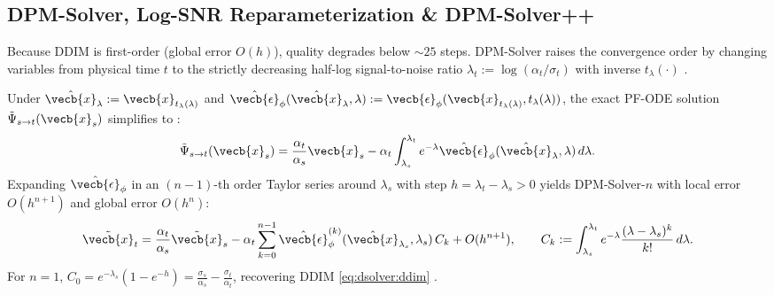 \documentclass[../../../../master.tex]{subfiles}
\begin{document}
\subsection{DPM-Solver, Log-SNR Reparameterization \& DPM-Solver++}

Because DDIM is first-order (global error $O(h)$), quality degrades below $\sim 25$ steps. DPM-Solver raises the convergence order by changing variables from physical time $t$ to the strictly decreasing half-log signal-to-noise ratio $\lambda_t := \log(\alpha_t/\sigma_t)$ with inverse $t_\lambda(\cdot)$ .

\begin{coremath}
Under $\hat{\vecb{x}}_\lambda := \vecb{x}_{t_\lambda(\lambda)}$ and $\hat{\vecb{\epsilon}}_\phi(\hat{\vecb{x}}_\lambda, \lambda) := \vecb{\epsilon}_\phi(\vecb{x}_{t_\lambda(\lambda)}, t_\lambda(\lambda))$, the exact PF-ODE solution $\tilde{\Psi}_{s\to t}(\vecb{x}_s)$ simplifies to :
\begin{equation}
  \label{eq:dsolver:dpm_exact}
  \tilde{\Psi}_{s\to t}(\vecb{x}_s) = \frac{\alpha_t}{\alpha_s}\vecb{x}_s - \alpha_t \int_{\lambda_s}^{\lambda_t} e^{-\lambda} \hat{\vecb{\epsilon}}_\phi(\hat{\vecb{x}}_\lambda, \lambda)\,d\lambda.
\end{equation}
Expanding $\hat{\vecb{\epsilon}}_\phi$ in an $(n-1)$-th order Taylor series around $\lambda_s$ with step $h = \lambda_t - \lambda_s > 0$ yields DPM-Solver-$n$ with local error $O(h^{n+1})$ and global error $O(h^n)$:
\begin{equation}
  \label{eq:dsolver:dpm_taylor}
  \tilde{\vecb{x}}_t = \frac{\alpha_t}{\alpha_s}\tilde{\vecb{x}}_s - \alpha_t \sum_{k=0}^{n-1} \hat{\vecb{\epsilon}}_\phi^{(k)}(\hat{\vecb{x}}_{\lambda_s}, \lambda_s)\, C_k + O(h^{n+1}),
  \qquad C_k := \int_{\lambda_s}^{\lambda_t} e^{-\lambda}\frac{(\lambda - \lambda_s)^k}{k!}\,d\lambda.
\end{equation}
For $n=1$, $C_0 = e^{-\lambda_s}(1 - e^{-h}) = \frac{\sigma_s}{\alpha_s} - \frac{\sigma_t}{\alpha_t}$, recovering DDIM \eqref{eq:dsolver:ddim} .
\end{coremath}
\end{document}
